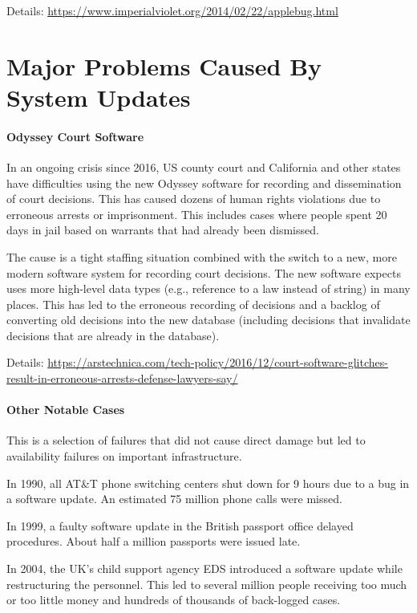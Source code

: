 Details: \url{https://www.imperialviolet.org/2014/02/22/applebug.html}

\section{Major Problems Caused By System Updates}

\paragraph{Odyssey Court Software}
In an ongoing crisis since 2016, US county court and California and other states have difficulties using the new Odyssey software for recording and dissemination of court decisions.
This has caused dozens of human rights violations due to erroneous arrests or imprisonment.
This includes cases where people spent 20 days in jail based on warrants that had already been dismissed.

The cause is a tight staffing situation combined with the switch to a new, more modern software system for recording court decisions.
The new software expects uses more high-level data types (e.g., reference to a law instead of string) in many places.
This has led to the erroneous recording of decisions and a backlog of converting old decisions into the new database (including decisions that invalidate decisions that are already in the database).

Details: \url{https://arstechnica.com/tech-policy/2016/12/court-software-glitches-result-in-erroneous-arrests-defense-lawyers-say/}

\paragraph{Other Notable Cases}
This is a selection of failures that did not cause direct damage but led to availability failures on important infrastructure.

In 1990, all AT\&T phone switching centers shut down for 9 hours due to a bug in a software update.
An estimated 75 million phone calls were missed.

In 1999, a faulty software update in the British passport office delayed procedures.
About half a million passports were issued late.

In 2004, the UK's child support agency EDS introduced a software update while restructuring the personnel.
This led to several million people receiving too much or too little money and hundreds of thousands of back-logged cases.

